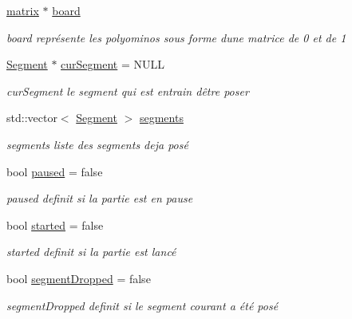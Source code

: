 \begin{DoxyCompactItemize}
\item 
\hyperlink{classmatrix}{matrix} $\ast$ \hyperlink{class_board_aaba5e7fbe2ca37b151abcf08fe5a48cd}{board}\hypertarget{class_board_aaba5e7fbe2ca37b151abcf08fe5a48cd}{}\label{class_board_aaba5e7fbe2ca37b151abcf08fe5a48cd}

\begin{DoxyCompactList}\small\item\em board représente les polyominos sous forme d\textquotesingle{}une matrice de 0 et de 1 \end{DoxyCompactList}\item 
\hyperlink{class_segment}{Segment} $\ast$ \hyperlink{class_board_a3f7976a204967a943d0c5a464ddad6a3}{cur\+Segment} = N\+U\+LL\hypertarget{class_board_a3f7976a204967a943d0c5a464ddad6a3}{}\label{class_board_a3f7976a204967a943d0c5a464ddad6a3}

\begin{DoxyCompactList}\small\item\em cur\+Segment le segment qui est entrain d\textquotesingle{}être poser \end{DoxyCompactList}\item 
std\+::vector$<$ \hyperlink{class_segment}{Segment} $>$ \hyperlink{class_board_ace42dd2bb49a49cfa537b218e03b52fd}{segments}\hypertarget{class_board_ace42dd2bb49a49cfa537b218e03b52fd}{}\label{class_board_ace42dd2bb49a49cfa537b218e03b52fd}

\begin{DoxyCompactList}\small\item\em segments liste des segments deja posé \end{DoxyCompactList}\item 
bool \hyperlink{class_board_aeadc14404bfb8ce40d0ca3736c7db5f6}{paused} = false\hypertarget{class_board_aeadc14404bfb8ce40d0ca3736c7db5f6}{}\label{class_board_aeadc14404bfb8ce40d0ca3736c7db5f6}

\begin{DoxyCompactList}\small\item\em paused definit si la partie est en pause \end{DoxyCompactList}\item 
bool \hyperlink{class_board_a357bd6048217a80d0773c404ddc1dee9}{started} = false\hypertarget{class_board_a357bd6048217a80d0773c404ddc1dee9}{}\label{class_board_a357bd6048217a80d0773c404ddc1dee9}

\begin{DoxyCompactList}\small\item\em started definit si la partie est lancé \end{DoxyCompactList}\item 
bool \hyperlink{class_board_a4accd5b6bccf3ce151e6ffc12fa26552}{segment\+Dropped} = false\hypertarget{class_board_a4accd5b6bccf3ce151e6ffc12fa26552}{}\label{class_board_a4accd5b6bccf3ce151e6ffc12fa26552}

\begin{DoxyCompactList}\small\item\em segment\+Dropped definit si le segment courant a été posé \end{DoxyCompactList}\end{DoxyCompactItemize}


